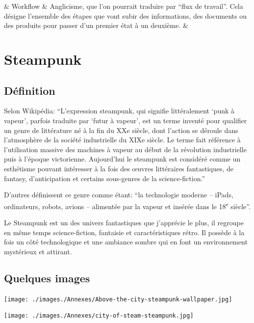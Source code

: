 \begin{center}
\begin{longtabu}
		& Workflow & Anglicisme, que l'on pourrait traduire par \enquote{flux de travail}. Cela désigne l'ensemble des étapes que vont subir des informations, des documents ou des produits pour passer d'un premier état à un deuxième.\cite{Workflow_} & \\
	\end{longtabu}
\end{center}


\chapter{Steampunk}
\label{app:steampunk}

\hspace*{4.5cm}
\begin{minipage}{\textwidth-4.5cm}
	\section*{Définition}
	\setlength{\parskip}{\currentparskip}
	Selon Wikipédia: \enquote{L'expression steampunk, qui signifie littéralement \enquote{punk à vapeur}, parfois traduite par \enquote{futur à vapeur}, est un terme inventé pour qualifier un genre de littérature né à la fin du XXe siècle, dont l'action se déroule dans l'atmosphère de la société industrielle du XIXe siècle. Le terme fait référence à l'utilisation massive des machines à vapeur au début de la révolution industrielle puis à l'époque victorienne. Aujourd'hui le steampunk est considéré comme un esthétisme pouvant intéresser à la fois des œuvres littéraires fantastiques, de fantasy, d'anticipation et certains sous-genres de la science-fiction.}\cite{Steampunk_}
	
	D'autres définissent ce genre comme étant: \enquote{la technologie moderne -- iPads, ordinateurs, robots, avions -- alimentée par la vapeur et insérée dans le 18\textsuperscript{e} siècle}.\cite{Whatissteampunk_}
	
	Le Steampunk est un des univers fantastiques que j'apprécie le plus, il regroupe en même temps science-fiction, fantaisie et caractéristiques rétro. Il possède à la fois un côté technologique et une ambiance sombre qui en font un environnement mystérieux et attirant.
\end{minipage}

\newpage
\section*{Quelques images}
\begin{minipage}{.49\textwidth}
\texttt{[image: ./images./Annexes/Above-the-city-steampunk-wallpaper.jpg]}
\\[-1mm]
\end{minipage}
\hspace{.02\textwidth}
\begin{minipage}{.49\textwidth}
\texttt{[image: ./images./Annexes/city-of-steam-steampunk.jpg]}
\\[-1mm]
\end{minipage}

